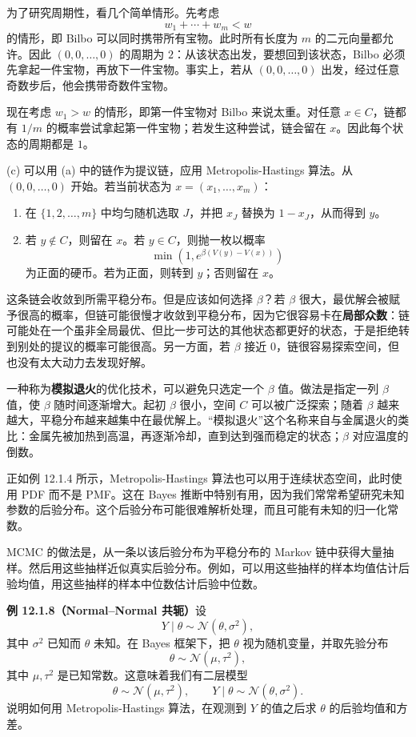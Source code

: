 \documentclass[UTF8, 12pt, fontset=fandol, oneside]{ctexart}
\begin{document}
为了研究周期性，看几个简单情形。先考虑
\[
  w_1+\cdots+w_m<w
\]
的情形，即 Bilbo 可以同时携带所有宝物。此时所有长度为 $m$ 的二元向量都允许。因此 $(0,0,\ldots,0)$ 的周期为 $2$：从该状态出发，要想回到该状态，Bilbo 必须先拿起一件宝物，再放下一件宝物。事实上，若从 $(0,0,\ldots,0)$ 出发，经过任意奇数步后，他会携带奇数件宝物。

现在考虑 $w_1>w$ 的情形，即第一件宝物对 Bilbo 来说太重。对任意 $x\in C$，链都有 $1/m$ 的概率尝试拿起第一件宝物；若发生这种尝试，链会留在 $x$。因此每个状态的周期都是 $1$。

(c) 可以用 (a) 中的链作为提议链，应用 Metropolis-Hastings 算法。从 $(0,0,\ldots,0)$ 开始。若当前状态为 $x=(x_1,\ldots,x_m)$：
\begin{enumerate}
  \item 在 $\{1,2,\ldots,m\}$ 中均匀随机选取 $J$，并把 $x_J$ 替换为 $1-x_J$，从而得到 $y$。
  \item 若 $y\notin C$，则留在 $x$。若 $y\in C$，则抛一枚以概率
  \[
    \min\left(1,e^{\beta(V(y)-V(x))}\right)
  \]
  为正面的硬币。若为正面，则转到 $y$；否则留在 $x$。
\end{enumerate}

这条链会收敛到所需平稳分布。但是应该如何选择 $\beta$？若 $\beta$ 很大，最优解会被赋予很高的概率，但链可能很慢才收敛到平稳分布，因为它很容易卡在\textbf{局部众数}：链可能处在一个虽非全局最优、但比一步可达的其他状态都更好的状态，于是拒绝转到别处的提议的概率可能很高。另一方面，若 $\beta$ 接近 $0$，链很容易探索空间，但也没有太大动力去发现好解。

一种称为\textbf{模拟退火}的优化技术，可以避免只选定一个 $\beta$ 值。做法是指定一列 $\beta$ 值，使 $\beta$ 随时间逐渐增大。起初 $\beta$ 很小，空间 $C$ 可以被广泛探索；随着 $\beta$ 越来越大，平稳分布越来越集中在最优解上。“模拟退火”这个名称来自与金属退火的类比：金属先被加热到高温，再逐渐冷却，直到达到强而稳定的状态；$\beta$ 对应温度的倒数。

正如例 12.1.4 所示，Metropolis-Hastings 算法也可以用于连续状态空间，此时使用 PDF 而不是 PMF。这在 Bayes 推断中特别有用，因为我们常常希望研究未知参数的后验分布。这个后验分布可能很难解析处理，而且可能有未知的归一化常数。

MCMC 的做法是，从一条以该后验分布为平稳分布的 Markov 链中获得大量抽样。然后用这些抽样近似真实后验分布。例如，可以用这些抽样的样本均值估计后验均值，用这些抽样的样本中位数估计后验中位数。

\noindent\textbf{例 12.1.8（Normal--Normal 共轭）}\quad 设
\[
  Y\mid\theta\sim\mathcal N(\theta,\sigma^2),
\]
其中 $\sigma^2$ 已知而 $\theta$ 未知。在 Bayes 框架下，把 $\theta$ 视为随机变量，并取先验分布
\[
  \theta\sim\mathcal N(\mu,\tau^2),
\]
其中 $\mu,\tau^2$ 是已知常数。这意味着我们有二层模型
\[
  \theta\sim\mathcal N(\mu,\tau^2),
  \qquad
  Y\mid\theta\sim\mathcal N(\theta,\sigma^2).
\]
说明如何用 Metropolis-Hastings 算法，在观测到 $Y$ 的值之后求 $\theta$ 的后验均值和方差。
\end{document}
